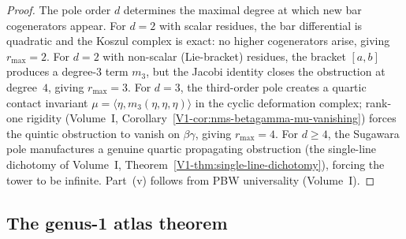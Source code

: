 \begin{proof}
The pole order $d$ determines the maximal degree at which new
bar cogenerators appear. For $d = 2$ with scalar residues,
the bar differential is quadratic and the Koszul complex is
exact: no higher cogenerators arise, giving
$r_{\max} = 2$. For $d = 2$ with non-scalar (Lie-bracket)
residues, the bracket $[a, b]$ produces a degree-$3$ term
$m_3$, but the Jacobi identity closes the obstruction at
degree~$4$, giving $r_{\max} = 3$.
For $d = 3$, the third-order pole creates a quartic contact
invariant $\mu = \langle\eta, m_3(\eta, \eta, \eta)\rangle$
in the cyclic deformation complex; rank-one rigidity
(Volume~I, Corollary~\ref*{V1-cor:nms-betagamma-mu-vanishing})
forces the quintic obstruction to vanish on $\beta\gamma$,
giving $r_{\max} = 4$. For $d \ge 4$, the Sugawara pole
manufactures a genuine quartic propagating obstruction
(the single-line dichotomy of Volume~I,
Theorem~\ref*{V1-thm:single-line-dichotomy}), forcing the tower
to be infinite. Part~(v) follows from PBW universality
(Volume~I).
\end{proof}

\subsection{The genus-1 atlas theorem}%
\label{subsec:genus1-atlas-theorem}

